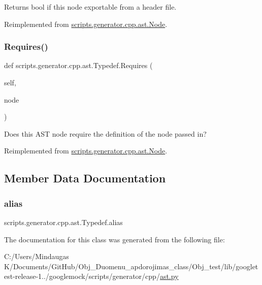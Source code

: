 \begin{DoxyVerb}Returns bool if this node exportable from a header file.\end{DoxyVerb}
 

Reimplemented from \mbox{\hyperlink{classscripts_1_1generator_1_1cpp_1_1ast_1_1_node_a298c446d34e08a78b5ebb477eb55863b}{scripts.\+generator.\+cpp.\+ast.\+Node}}.

\mbox{\label{classscripts_1_1generator_1_1cpp_1_1ast_1_1_typedef_a1a243bef75ae51119bd84d6304860c48}} 
\subsubsection{\texorpdfstring{Requires()}{Requires()}}
{\footnotesize\ttfamily def scripts.\+generator.\+cpp.\+ast.\+Typedef.\+Requires (\begin{DoxyParamCaption}\item[{}]{self,  }\item[{}]{node }\end{DoxyParamCaption})}

\begin{DoxyVerb}Does this AST node require the definition of the node passed in?\end{DoxyVerb}
 

Reimplemented from \mbox{\hyperlink{classscripts_1_1generator_1_1cpp_1_1ast_1_1_node_a37c4215d199947155270a485a3add21e}{scripts.\+generator.\+cpp.\+ast.\+Node}}.



\subsection{Member Data Documentation}
\mbox{\label{classscripts_1_1generator_1_1cpp_1_1ast_1_1_typedef_afbfe7d8c4728de7d8d28ef31dcbcbed3}} 
\subsubsection{\texorpdfstring{alias}{alias}}
{\footnotesize\ttfamily scripts.\+generator.\+cpp.\+ast.\+Typedef.\+alias}



The documentation for this class was generated from the following file\+:\begin{DoxyCompactItemize}
\item 
C\+:/\+Users/\+Mindaugas K/\+Documents/\+Git\+Hub/\+Obj\+\_\+\+Duomenu\+\_\+apdorojimas\+\_\+class/\+Obj\+\_\+test/lib/googletest-\/release-\/1../googlemock/scripts/generator/cpp/\mbox{\hyperlink{_obj__test_2lib_2googletest-release-1_88_81_2googlemock_2scripts_2generator_2cpp_2ast_8py}{ast.\+py}}\end{DoxyCompactItemize}
